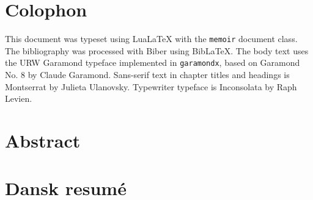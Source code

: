 \documentclass[a4paper,12pt,onecolumn,twoside,final]{memoir}
\begin{document}
\begin{titlingpage}
\end{titlingpage}

\frontmatter
\section*{Colophon}
This document was typeset using Lua\LaTeX{} with the \texttt{memoir} document class. The bibliography was processed with Biber using Bib\LaTeX{}.
The body text uses the URW Garamond typeface implemented in \texttt{garamondx}, based on Garamond No. 8 by Claude Garamond. Sans-serif text in chapter titles and headings is Montserrat by Julieta Ulanovsky. Typewriter typeface is Inconsolata by Raph Levien.

\clearpage
\section{Abstract}


\clearpage
\section[Danish summary]{Dansk resum\'e}

\end{document}
